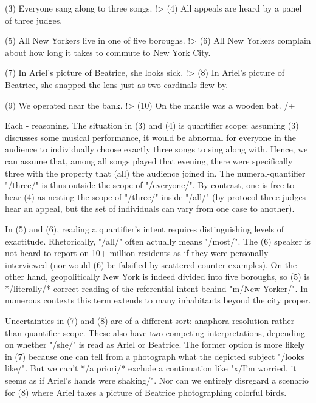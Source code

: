 (3)  Everyone sang along to three songs. !>
(4)  All appeals are heard by a panel of three judges.

(5)  All New Yorkers live in one of five boroughs. !>
(6)  All New Yorkers complain about how long it takes to commute to New York City.

(7)  In Ariel's picture of Beatrice, she looks sick. !>
(8)  In Ariel's picture of Beatrice, she snapped the lens just 
as two cardinals flew by. -%

(9)  We operated near the bank. !>
(10)  On the mantle was a wooden bat.
/+

Each -%
reasoning.  The situation in (3) and (4) is quantifier scope: assuming (3) discusses some 
musical performance, it would be abnormal for everyone in the audience to individually choose 
exactly three songs to sing along with.  Hence, we can assume that, among all songs 
played that evening, there were specifically three with the property that (all) the audience 
joined in.  The numeral-quantifier "/three/" is thus outside the scope of "/everyone/".
By contrast, one is free to hear (4) as nesting the scope of "/three/" inside "/all/" 
(by protocol three judges hear an appeal, but the set of 
individuals can vary from one case to another).  

In (5) and (6), reading a quantifier's intent requires distinguishing levels of exactitude.  Rhetorically, 
"/all/" often actually means "/most/".  The (6) speaker is not heard to 
report on 10+ million residents as if they were personally interviewed (nor would (6) be 
falsified by scattered counter-examples).  On the other hand, geopolitically New York is indeed 
divided into five boroughs, so (5) is */literally/* correct %
reading of the referential intent behind "m/New Yorker/".  In numerous contexts this term extends 
to many inhabitants beyond the city proper.

Uncertainties in (7) and (8) are of a different sort: anaphora resolution rather than quantifier scope.  
These also have two competing interpretations, depending on whether "/she/" is read as Ariel or Beatrice.  The 
former option is more likely in (7) because one can tell from a photograph what the depicted subject 
"/looks like/".  But we can't */a priori/* exclude a continuation like "x/I'm worried, 
it seems as if Ariel's hands were shaking/".  
Nor can we entirely disregard a scenario for (8) where Ariel takes a picture of 
Beatrice photographing colorful birds.


